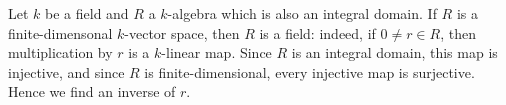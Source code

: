 Let $k$ be a field and $R$ a $k$-algebra which is also an integral domain.
If $R$ is a finite-dimensonal $k$-vector space, then $R$ is a field: indeed,
if $0\neq r \in R$, then multiplication by $r$ is a $k$-linear map. Since
$R$ is an integral domain, this map is injective, and since  $R$ is finite-dimensional,
every injective map is surjective. Hence we find an inverse of $r$.
